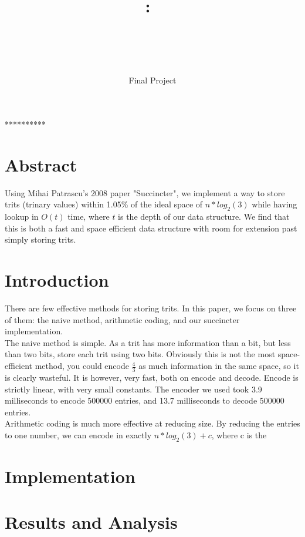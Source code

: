 \documentclass{article}
\title{\textmd{\textbf{\Class:\ \Title}}\\\normalsize\vspace{0.1in}\small{ \Date}\\\vspace{0.1in}\large{\textit{\ClassInstructor\ \ClassTime}}}
\author{\textbf{\AuthorName}}
\date{Final Project}
\begin{document}
\maketitle

\bigskip
\centerline{**********}

\noindent \section{Abstract}
Using Mihai Patrascu's 2008 paper "Succincter",  we implement a way to store trits (trinary values) within 1.05\% of the ideal space of $n*log_2(3)$ while having lookup in $O(t)$ time, where $t$ is the depth of our data structure. We find that this is both a fast and space efficient data structure with room for extension past simply storing trits.

\noindent \section{Introduction}

There are few effective methods for storing trits. In this paper, we focus on three of them: the naive method, arithmetic coding, and our succincter implementation.\\
The naive method is simple. As a trit has more information than a bit, but less than two bits, store each trit using two bits. Obviously this is not the most space-efficient method, you could encode $\frac{4}{3}$ as much information in the same space, so it is clearly wasteful. It is however, very fast, both on encode and decode. Encode is strictly linear, with very small constants. The encoder we used took 3.9 milliseconds to encode 500000 entries, and 13.7 milliseconds to decode 500000 entries.\\
Arithmetic coding is much more effective at reducing size. By reducing the entries to one number, we can encode in exactly $n*log_2(3) + c$, where c is the 

\noindent \section{Implementation}


\bigskip

\noindent \section{Results and Analysis}
\end{document}
